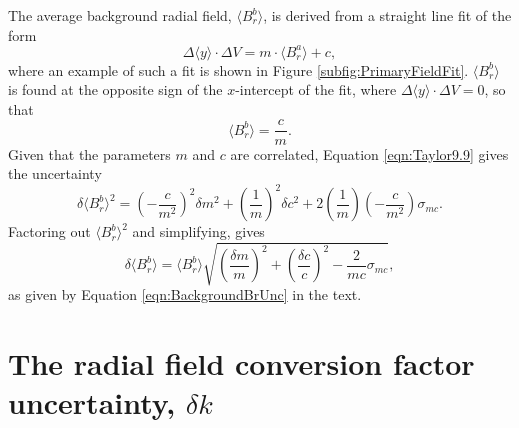 \begin{appendices}
The average background radial field, $\langle B_{r}^{b} \rangle$, is derived from a straight line fit of the form
%
\begin{equation}
  \Delta \langle y \rangle \cdot \Delta V = m\cdot \langle B_{r}^{a} \rangle + c,
\end{equation} 
%
where an example of such a fit is shown in Figure \ref{subfig:PrimaryFieldFit}. $\langle B_{r}^{b} \rangle$ is found at the opposite sign of the $x$-intercept of the fit, where $\Delta \langle y \rangle \cdot \Delta V = 0$, so that
%
\begin{equation}
  \langle B_{r}^{b} \rangle  = \frac{c}{m}.
\end{equation} 
%
Given that the parameters $m$ and $c$ are correlated, Equation \ref{eqn:Taylor9.9} gives the uncertainty 
%
\begin{equation}
  \delta \langle B_{r}^{b} \rangle^{2} = \left(-\frac{c}{m^{2}}\right)^{2} \delta m^{2}  
   + \left(\frac{1}{m}\right)^{2} \delta c^{2} 
   + 2\left(\frac{1}{m}\right)\left(-\frac{c}{m^{2}}\right)\sigma_{mc}.
\end{equation}
%
Factoring out $\langle B_{r}^{b} \rangle^{2}$ and simplifying, gives 
%
\begin{equation}
  \delta \langle B_{r}^{b} \rangle = \langle B_{r}^{b} \rangle \sqrt{ \left(\frac{\delta m}{m}\right)^{2} + \left(\frac{\delta c}{c}\right)^{2} - \frac{2}{mc}\sigma_{mc} },
\label{eqn:BackgroundBrUnc2}
\end{equation}
%
as given by Equation \ref{eqn:BackgroundBrUnc} in the text.

\section{The radial field conversion factor uncertainty, $\delta k$}\label{app:k}


\end{appendices}
